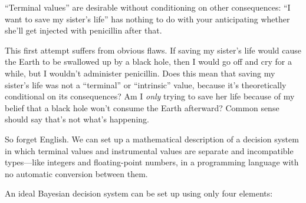  ``Terminal values'' are
desirable without conditioning on other consequences:
``I want to save my sister's
life'' has nothing to do with your anticipating
whether she'll get injected with penicillin after
that.


 This first attempt suffers from obvious flaws. If saving my
sister's life would cause the Earth to be swallowed up
by a black hole, then I would go off and cry for a while, but I
wouldn't administer penicillin. Does this mean that
saving my sister's life was not a
``terminal'' or
``intrinsic'' value, because
it's theoretically conditional on its consequences? Am
I \textit{only} trying to save her life because of my belief that a
black hole won't consume the Earth afterward? Common
sense should say that's not what's
happening.


 So forget English. We can set up a mathematical description of a
decision system in which terminal values and instrumental values are
separate and incompatible types---like integers and floating-point
numbers, in a programming language with no automatic conversion between
them.


 An ideal Bayesian decision system can be set up using only four
elements:

